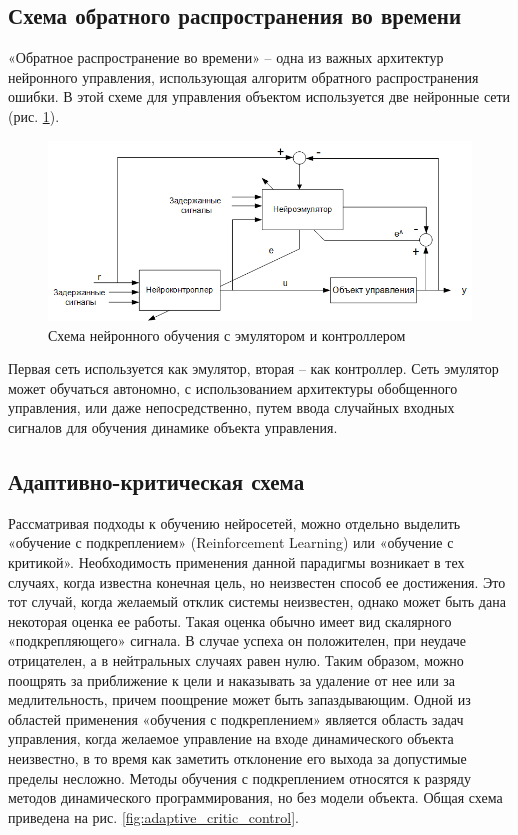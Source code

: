 \subsection{Схема обратного распространения во времени}

«Обратное распространение во времени» – одна из важных архитектур нейронного управления, использующая алгоритм обратного распространения ошибки. В этой схеме для управления объектом используется две нейронные сети (рис. \ref{fig:neuro_emulator_with_controller}).

\begin{figure}[H]
    \centering
    \includegraphics[width=\textwidth]{images/chapter1/Схема нейронного обучения с эмулятором и контроллером.png}
    \caption{Схема нейронного обучения с эмулятором и контроллером}
    \label{fig:neuro_emulator_with_controller}
\end{figure}

Первая сеть используется как эмулятор, вторая – как контроллер. Сеть эмулятор может обучаться автономно, с использованием архитектуры обобщенного управления, или даже непосредственно, путем ввода случайных входных сигналов для обучения динамике объекта управления.

\subsection{Адаптивно-критическая схема}

Рассматривая подходы к обучению нейросетей, можно отдельно выделить  «обучение с подкреплением» (Reinforcement Learning) или «обучение с критикой». Необходимость применения данной парадигмы возникает в тех случаях, когда известна конечная цель, но неизвестен способ ее достижения. Это тот случай, когда желаемый отклик системы неизвестен, однако может быть дана некоторая оценка ее работы. Такая оценка обычно имеет вид скалярного «подкрепляющего» сигнала. В случае успеха он положителен, при неудаче отрицателен, а в нейтральных случаях равен нулю. Таким образом, можно поощрять за приближение к цели и наказывать за удаление от нее или за медлительность, причем поощрение может быть запаздывающим. Одной из областей применения «обучения с подкреплением» является область задач управления, когда желаемое управление на входе динамического объекта неизвестно, в то время как заметить отклонение его выхода за допустимые пределы несложно. Методы обучения с подкреплением относятся к разряду методов динамического программирования, но без модели объекта. Общая схема приведена на рис. \ref{fig:adaptive_critic_control}.

